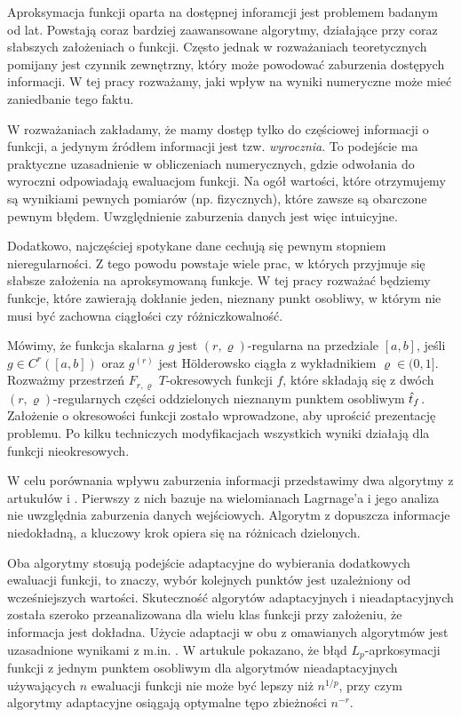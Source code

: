 \documentclass[oik, pdftex, robocza, man]{mgrwms}
\begin{document}
\begin{wstep}[Wprowadzenie]
    Aproksymacja funkcji oparta na dostępnej inforamcji jest problemem badanym od lat. Powstają coraz bardziej zaawansowane algorytmy, działające przy coraz słabszych założeniach o funkcji. Często jednak w rozważaniach teoretycznych pomijany jest czynnik zewnętrzny, który może powodować zaburzenia dostępych informacji. W tej pracy rozważamy, jaki wpływ na wyniki numeryczne może mieć zaniedbanie tego faktu.

    W rozważaniach zakładamy, że mamy dostęp tylko do częściowej informacji o funkcji, a jedynym źródłem informacji jest tzw. \textit{wyrocznia}. To podejście ma praktyczne uzasadnienie w obliczeniach numerycznych, gdzie odwołania do wyroczni odpowiadają ewaluacjom funkcji. Na ogół wartości, które otrzymujemy są wynikiami pewnych pomiarów (np. fizycznych), które zawsze są obarczone pewnym błędem. Uwzględnienie zaburzenia danych jest więc intuicyjne.
    
    Dodatkowo, najczęściej spotykane dane cechują się pewnym stopniem nieregularności. Z tego powodu powstaje wiele prac, w których przyjmuje się słabsze założenia na aproksymowaną funkcje. W tej pracy rozważać będziemy funkcje, które zawierają dokłanie jeden, nieznany punkt osobliwy, w którym nie musi być zachowna ciągłości czy różniczkowalność.

    Mówimy, że funkcja skalarna $g$ jest $(r, \varrho)$-regularna na przedziale $[a,b]$, jeśli $g \in C^{r}([a,b])$ oraz $g^{(r)}$ jest Hölderowsko ciągła z wykładnikiem $\varrho \in (0,1]$. Rozważmy przestrzeń $F_{r,\varrho}$ $T$-okresowych funkcji $f$, które składają się z dwóch $(r,\varrho)$-regularnych części oddzielonych nieznanym punktem osobliwym $\hat{t}_{f}$. Założenie o okresowości funkcji zostało wprowadzone, aby uprościć prezentację problemu. Po kilku techniczych modyfikacjach wszystkich wyniki działają dla funkcji nieokresowych.

    W celu porównania wpływu zaburzenia informacji przedstawimy dwa algorytmy z artukułów \cite{AoP} i \cite{CoDF}. Pierwszy z nich bazuje na wielomianach Lagrnage'a i jego analiza nie uwzględnia zaburzenia danych wejściowych. Algorytm z \cite{AoP} dopuszcza informacje niedokładną, a kluczowy krok opiera się na różnicach dzielonych. 

    Oba algorytmy stosują podejście adaptacyjne do wybierania dodatkowych ewaluacji funkcji, to znaczy, wybór kolejnych punktów jest uzależniony od wcześniejszych wartości. Skuteczność algorytów adaptacyjnych i nieadaptacyjnych została szeroko przeanalizowana dla wielu klas funkcji przy założeniu, że informacja jest dokładna. Użycie adaptacji w obu z omawianych algorytmów jest uzasadnione wynikami z m.in. \cite{PoA}. W artukule pokazano, że błąd $L_{p}$-aprkosymacji funkcji z jednym punktem osobliwym dla algorytmów nieadaptacyjnych używających $n$ ewaluacji funkcji nie może być lepszy niż $n^{1/p}$, przy czym algorytmy adaptacyjne osiągają optymalne tępo zbieżności $n^{-r}$.


\end{wstep}
\end{document}
